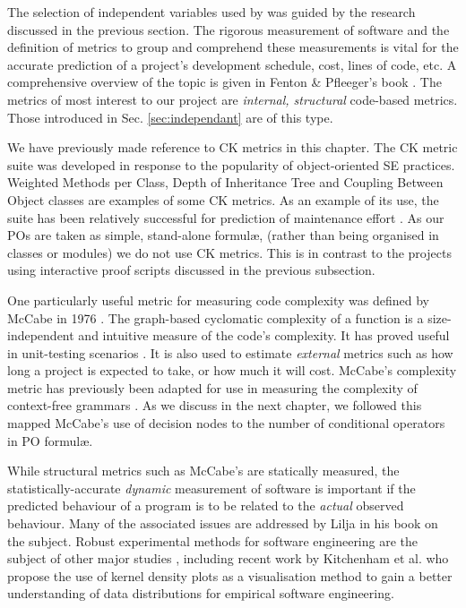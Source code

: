 The selection of independent variables used by \where was guided by the research discussed in the previous section.
The rigorous measurement of software and the definition of metrics to group and comprehend these measurements is vital for the accurate prediction of a project's development schedule, cost, lines of code, etc. 
A comprehensive overview of the topic is given in Fenton \& Pfleeger's book \cite{FentonPfleeger}. 
The metrics of most interest to our project are \textit{internal, structural} code-based metrics. 
Those introduced in Sec. \ref{sec:independant} are of this type.

We have previously made reference to CK metrics in this chapter. 
The CK metric suite was developed in response to the popularity of object-oriented SE practices. 
Weighted Methods per Class, Depth of Inheritance Tree and Coupling Between Object classes are examples of some CK metrics. 
As an example of its use, the suite has been relatively successful for prediction of maintenance effort \cite{LiHenry}. 
As our POs are taken as simple, stand-alone formul\ae, (rather than being organised in classes or modules) we do not use CK metrics. 
This is in contrast to the projects using interactive proof scripts discussed in the previous subsection. 

One particularly useful metric for measuring code complexity was defined by McCabe in 1976 \cite{McCabe}. The graph-based cyclomatic complexity of a function is a size-independent and intuitive measure of the code's complexity. It has proved useful in unit-testing scenarios \cite{McCabeTesting}. It is also used to estimate \textit{external} metrics such as how long a project is expected to take, or how much it will cost.  McCabe's complexity metric has previously been adapted for use in measuring the complexity of context-free grammars \cite{nuimeprn6458}. As we discuss in the next chapter, we followed this  mapped McCabe's use of decision nodes to the number of conditional operators in \why PO formul\ae.

While structural metrics such as McCabe's are statically measured, the statistically-accurate \textit{dynamic} measurement of software is important if the predicted behaviour of a program is to be related to the \textit{actual} observed behaviour. Many of the associated issues are addressed by Lilja \cite{LiljaJ} in his book on the subject. Robust experimental methods for software engineering are the subject of other major studies \cite{AdvancedESE}, including recent work by Kitchenham et al. \cite{Kitchenham2016} who propose the use of kernel density plots as a visualisation method to gain a better understanding of data distributions for empirical software engineering.


